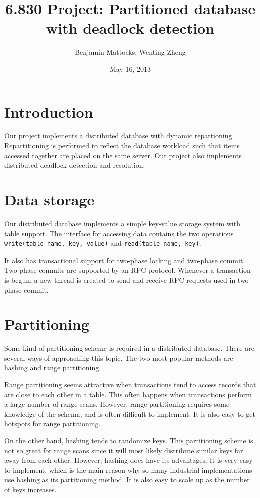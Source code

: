 \documentclass[a4paper, 10pt, notitlepage]{report}
\title{6.830 Project: Partitioned database with deadlock detection} %
\author{Benjamin Mattocks, Wenting Zheng} %
\date{May 16, 2013} %
\begin{document}
\maketitle
\thispagestyle{empty}
\newpage


%
\section*{Introduction}
Our project implements a distributed database with dynamic repartioning. Repartitioning is performed to reflect the database workload such that items accessed together are placed on the same server. Our project also implements distributed deadlock detection and resolution.

\section*{Data storage}
Our distributed database implements a simple key-value storage system with table support. The interface for accessing data contains the two operations \texttt{write(table\_name, key, value)} and \texttt{read(table\_name, key)}.

It also has transactional support for two-phase locking and two-phase commit. Two-phase commits are supported by an RPC protocol. Whenever a transaction is begun, a new thread is created to send and receive RPC requests used in two-phase commit.

\section*{Partitioning}

Some kind of partitioning scheme is required in a distributed database. There are several ways of approaching
this topic. The two most popular methods are hashing and range partitioning.

Range partitioning seems attractive when transactions tend to access records that are close to each other
in a table. This often happens when transactions perform a large number of range scans. However, range partitioning
requires some knowledge of the schema, and is often difficult to implement. It is also easy to get hotspots for
range partitioning.

On the other hand, hashing tends to randomize keys. This partitioning scheme is not so great for range scans
since it will most likely distribute similar keys far away from each other. However, hashing does have its advantages.
It is very easy to implement, which is the main reason why so many industrial implementations use hashing as its
partitioning method. It is also easy to scale up as the number of keys increases. 
\end{document}

